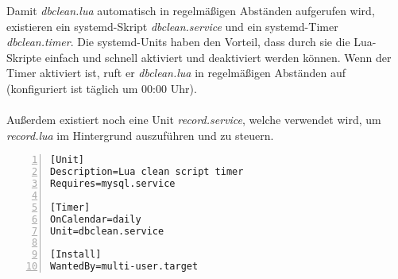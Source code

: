 Damit \textit{dbclean.lua} automatisch in regelm\"a{\ss}igen Abst\"anden aufgerufen wird, existieren ein systemd-Skript \textit{dbclean.service} und ein systemd-Timer \textit{dbclean.timer}. Die systemd-Units haben den Vorteil, dass durch sie die Lua-Skripte  einfach und schnell aktiviert und deaktiviert werden k\"onnen. Wenn der Timer aktiviert ist, ruft er \textit{dbclean.lua} in regelm\"a{\ss}igen Abst\"anden auf (konfiguriert ist t\"aglich um 00:00 Uhr).\\
\\
Au{\ss}erdem existiert noch eine Unit \textit{record.service}, welche verwendet wird, um \textit{record.lua} im Hintergrund auszuf\"uhren und zu steuern.\\

\begin{lstlisting}[caption={Ein systemd-Timer hat eine relativ einfache Struktur.},numbers=left,frame=lrbt]
[Unit]
Description=Lua clean script timer
Requires=mysql.service

[Timer]
OnCalendar=daily
Unit=dbclean.service

[Install]
WantedBy=multi-user.target
\end{lstlisting}
\vspace{1.5cm}
